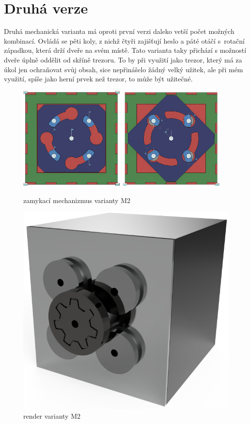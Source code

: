 \section{Druhá verze}

Druhá mechanická varianta má oproti první verzi daleko vetší počet možných kombinací.
Ovládá se pěti koly, z nichž čtyři zajišťují heslo a páté otáčí s~rotační západkou, která drží dveře na svém místě.
Tato varianta taky přichází s možností dveře úplně oddělit od skříně trezoru. To by při využití jako trezor, který
má za úkol jen ochraňovat svůj obsah, sice nepřinášelo žádný velký užitek, ale při mém využití, spíše jako herní 
prvek než trezor, to může být užitečné.

\begin{figure}[htbp]
    \centering
    \includegraphics[width=150pt]{kapitoly/obrazky/M2/mechanizmus_odemcen.png}
    \includegraphics[width=150pt]{kapitoly/obrazky/M2/mechanizmus_zamceno.png}
    \caption{zamykací mechanizmus varianty M2}
    \label{fig:M2-mechanizmus}
\end{figure}

\begin{figure}[htbp]
    \centering
    \includegraphics[width=\textwidth]{kapitoly/obrazky/M2/predni_render.PNG}
    \caption{render varianty M2}
    \label{fig:M1.0}
\end{figure}


\newpage